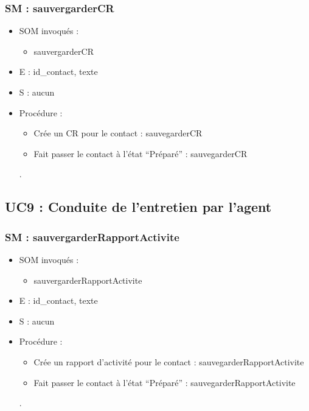 \subsubsection{SM : sauvergarderCR}
\begin{itemize}
	\item SOM invoqués :
	\begin{itemize}
		\item sauvergarderCR
	\end{itemize}
	\item E : id\_contact, texte
	\item S : aucun
	\item Procédure :
	\begin{itemize}
		\item Crée un CR pour le contact : sauvegarderCR
		\item Fait passer le contact à l’état “Préparé” : sauvegarderCR
	\end{itemize}.
\end{itemize}



\subsection{UC9 : Conduite de l’entretien par l’agent}
\subsubsection{SM : sauvergarderRapportActivite}
\begin{itemize}
	\item SOM invoqués :
	\begin{itemize}
		\item sauvergarderRapportActivite
	\end{itemize}
	\item E : id\_contact, texte
	\item S : aucun
	\item Procédure :
	\begin{itemize}
		\item Crée un rapport d’activité pour le contact :
	sauvegarderRapportActivite
		\item Fait passer le contact à l’état “Préparé” : sauvegarderRapportActivite
	\end{itemize}.
\end{itemize}

